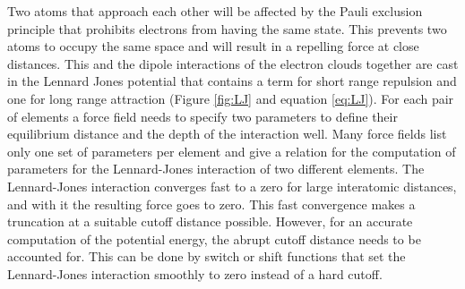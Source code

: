 \documentclass[english, a4paper, 12pt, titlepage, draft]{article}
\begin{document}
Two atoms that approach each other will be affected by the Pauli exclusion principle that prohibits electrons from having the same state.
This prevents two atoms to occupy the same space and will result in a repelling force at close distances.
This and the dipole interactions of the electron clouds together are cast in the Lennard Jones potential that contains a term for short range repulsion and one for long range attraction (Figure \ref{fig:LJ} and equation \ref{eq:LJ}).
For each pair of elements a force field needs to specify two parameters to define their equilibrium distance and the depth of the interaction well.
Many force fields list only one set of parameters per element and give a relation for the computation of parameters for the Lennard-Jones interaction of two different elements.
The Lennard-Jones interaction converges fast to a zero for large interatomic distances, and with it the resulting force goes to zero.
This fast convergence makes a truncation at a suitable cutoff distance possible.
However, for an accurate computation of the potential energy, the abrupt cutoff distance needs to be accounted for.
This can be done by switch or shift functions that set the Lennard-Jones interaction smoothly to zero instead of a hard cutoff.
\end{document}
